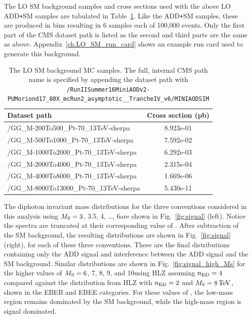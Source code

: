 The LO SM background samples and cross sections used with the above LO ADD\texttt{+}SM samples are tabulated in Table~\ref{tab:signal_samples_background}. Like the ADD\texttt{+}SM samples, these are produced in \Mgg bins resulting in 6 samples each of 100,000 events. Only the first part of the CMS dataset path is listed as the second and third parts are the same as above. Appendix~\ref{ch:LO_SM_run_card} shows an example \SHERPA run card used to generate this background.

\begin{table}[htbp!]
	\caption{The LO SM background MC samples. The full, internal CMS path name is specified by appending the dataset path with \texttt{/RunIISummer16MiniAODv2-\allowbreak PUMoriond17\_\allowbreak 80X\_\allowbreak mcRun2\_\allowbreak asymptotic\_\_\allowbreak TrancheIV\_\allowbreak v6/\allowbreak MINIAODSIM}}
	\label{tab:signal_samples_background}
	\centering
  \vspace{\baselineskip}
	\begin{tabular}{lc}
	\hline \hline
	Dataset path & Cross section (pb) \\
	\hline
	/GG\_M-200To500\_Pt-70\_13TeV-sherpa    & 8.923e-01 \\
	/GG\_M-500To1000\_Pt-70\_13TeV-sherpa   & 7.592e-02 \\
	/GG\_M-1000To2000\_Pt-70\_13TeV-sherpa  & 6.292e-03 \\
	/GG\_M-2000To4000\_Pt-70\_13TeV-sherpa  & 2.315e-04 \\
	/GG\_M-4000To8000\_Pt-70\_13TeV-sherpa  & 1.669e-06 \\
	/GG\_M-8000To13000\_Pt-70\_13TeV-sherpa & 5.430e-11 \\
	\hline \hline
	\end{tabular}
\end{table}

 The diphoton invariant mass distributions for the three \KK conventions considered in this analysis using $M_{\rm S}=3$, 3.5, 4, \dots, 6\TeV are shown in Fig.~\ref{fig:signal} (left). Notice the spectra are truncated at their corresponding value of \Ms. After subtraction of the SM background, the resulting \mgg distributions are shown in Fig.~\ref{fig:signal} (right), for each of these three \KK conventions. These are the final \mgg distributions containing only the ADD signal and interference between the ADD signal and the SM background. Similar distributions are shown in Fig.~\ref{fig:signal_high_Ms} for the higher values of $M_{\rm S} = 6$, 7, 8, 9, and 10\TeV using HLZ assuming $n_{\rm ED}=4$ compared against the distribution from HLZ with $n_{\rm ED} = 2$ and $M_{\rm S} = 8\,\text{Te\hspace{-.08em}V}$, shown in the EBEB and EBEE categories. For these values of \Ms, the low-mass region remains dominated by the SM background, while the high-mass region is signal dominated.

